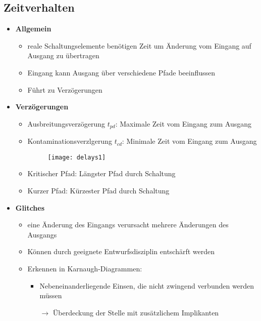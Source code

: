 \subsection{Zeitverhalten}
\begin{itemize}

\item \textbf{Allgemein}
	\begin{itemize}
	\item reale Schaltungselemente benötigen Zeit um Änderung vom Eingang auf Ausgang zu übertragen
	\item Eingang kann Ausgang über verschiedene Pfade beeinflussen
	\item Führt zu Verzögerungen
	\end{itemize}
	
\item \textbf{Verzögerungen}
	\begin{itemize}
	\item Ausbreitungsverzögerung $t_{pd}$: Maximale Zeit vom Eingang zum Ausgang
	\item Kontaminationsverzlgerung $t_{cd}$: Minimale Zeit vom Eingang zum Ausgang
	\item[] \begin{figure}[H]
				\begin{center}
				\texttt{[image: delays1]}
				\end{center}
			\end{figure}
	\item Kritischer Pfad: Längster Pfad durch Schaltung
	\item Kurzer Pfad: Kürzester Pfad durch Schaltung	
	\end{itemize}

\item \textbf{Glitches}
	\begin{itemize}
	\item eine Änderung des Eingangs verursacht mehrere Änderungen des Ausgangs
	\item Können durch geeignete Entwurfsdisziplin entschärft werden
	\item Erkennen in Karnaugh-Diagrammen:
		\begin{itemize}
		\item Nebeneinanderliegende Einsen, die nicht zwingend verbunden werden müssen
		\item[$\rightarrow$] Überdeckung der Stelle mit zusätzlichem Implikanten
		\end{itemize}
	\end{itemize}

\end{itemize}

